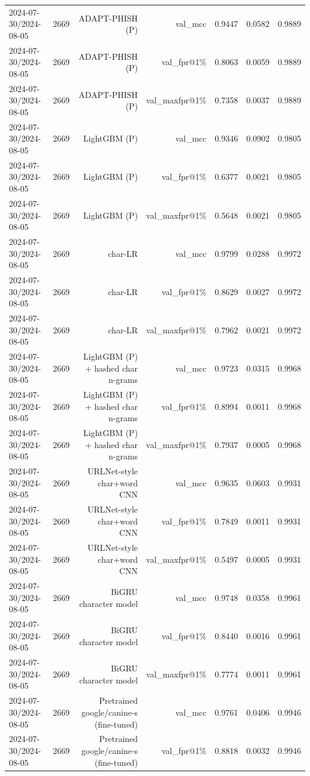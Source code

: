 \begin{table}[t]
\begin{tabular}{llrrrrr}
2024-07-30/2024-08-05 & 2669 & ADAPT-PHISH (P) & val\_mcc & 0.9447 & 0.0582 & 0.9889 \\
2024-07-30/2024-08-05 & 2669 & ADAPT-PHISH (P) & val\_fpr@1\% & 0.8063 & 0.0059 & 0.9889 \\
2024-07-30/2024-08-05 & 2669 & ADAPT-PHISH (P) & val\_maxfpr@1\% & 0.7358 & 0.0037 & 0.9889 \\
2024-07-30/2024-08-05 & 2669 & LightGBM (P) & val\_mcc & 0.9346 & 0.0902 & 0.9805 \\
2024-07-30/2024-08-05 & 2669 & LightGBM (P) & val\_fpr@1\% & 0.6377 & 0.0021 & 0.9805 \\
2024-07-30/2024-08-05 & 2669 & LightGBM (P) & val\_maxfpr@1\% & 0.5648 & 0.0021 & 0.9805 \\
2024-07-30/2024-08-05 & 2669 & char-LR & val\_mcc & 0.9799 & 0.0288 & 0.9972 \\
2024-07-30/2024-08-05 & 2669 & char-LR & val\_fpr@1\% & 0.8629 & 0.0027 & 0.9972 \\
2024-07-30/2024-08-05 & 2669 & char-LR & val\_maxfpr@1\% & 0.7962 & 0.0021 & 0.9972 \\
2024-07-30/2024-08-05 & 2669 & LightGBM (P) + hashed char n-grams & val\_mcc & 0.9723 & 0.0315 & 0.9968 \\
2024-07-30/2024-08-05 & 2669 & LightGBM (P) + hashed char n-grams & val\_fpr@1\% & 0.8994 & 0.0011 & 0.9968 \\
2024-07-30/2024-08-05 & 2669 & LightGBM (P) + hashed char n-grams & val\_maxfpr@1\% & 0.7937 & 0.0005 & 0.9968 \\
2024-07-30/2024-08-05 & 2669 & URLNet-style char+word CNN & val\_mcc & 0.9635 & 0.0603 & 0.9931 \\
2024-07-30/2024-08-05 & 2669 & URLNet-style char+word CNN & val\_fpr@1\% & 0.7849 & 0.0011 & 0.9931 \\
2024-07-30/2024-08-05 & 2669 & URLNet-style char+word CNN & val\_maxfpr@1\% & 0.5497 & 0.0005 & 0.9931 \\
2024-07-30/2024-08-05 & 2669 & BiGRU character model & val\_mcc & 0.9748 & 0.0358 & 0.9961 \\
2024-07-30/2024-08-05 & 2669 & BiGRU character model & val\_fpr@1\% & 0.8440 & 0.0016 & 0.9961 \\
2024-07-30/2024-08-05 & 2669 & BiGRU character model & val\_maxfpr@1\% & 0.7774 & 0.0011 & 0.9961 \\
2024-07-30/2024-08-05 & 2669 & Pretrained google/canine-s (fine-tuned) & val\_mcc & 0.9761 & 0.0406 & 0.9946 \\
2024-07-30/2024-08-05 & 2669 & Pretrained google/canine-s (fine-tuned) & val\_fpr@1\% & 0.8818 & 0.0032 & 0.9946 \\

\end{tabular}
\end{table}
